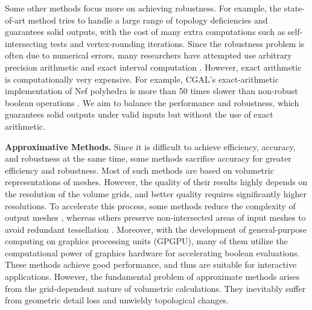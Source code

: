 Some other methods focus more on achieving robustness. For example, the state-of-art method \cite{zhou2016mesh} tries to handle a large range of topology deficiencies and guarantees solid outputs, with the cost of many extra computations such as self-intersecting tests and vertex-rounding iterations.
Since the robustness problem is often due to numerical errors, many researchers have attempted use arbitrary precision arithmetic \cite{banerjee1996topologically, fortune1995polyhedral, keyser2004esolid, granados2003boolean, hachenberger2005boolean, zhou2016mesh,barki2015exact} and exact interval computation \cite{fang1993robustness, hu1996robust, segal1990using}. However, exact arithmetic is computationally very expensive. For example, CGAL's \cite{cgal:hk-bonp3-15a} exact-arithmetic implementation \cite{granados2003boolean} of Nef polyhedra \cite{bieri1988elementary} is more than 50 times slower than non-robust boolean operations \cite{bernstein2009fast} . We aim to balance the performance and robustness, which guarantees solid outputs under valid inputs but without the use of exact arithmetic.


\textbf{Approximative Methods.}
Since it is difficult to achieve efficiency, accuracy, and robustness at the same time, some methods  sacrifice accuracy for greater efficiency and robustness. Most of such methods are based on volumetric representations of meshes. However, the quality of their results highly depends on the resolution of the volume grids, and better quality requires significantly higher resolutions.
To accelerate this process, some methods reduce the complexity of output meshes \cite{varadhan2004topology}, whereas others preserve non-intersected areas of input meshes to avoid redundant tessellation \cite{pavic2010hybrid,wang2011approximate,zhao2011parallel,hable2005blister,ogayar2006gpu,updegrove2016boolean}.
Moreover, with the development of general-purpose computing on graphics processing units (GPGPU), many of them utilize the computational power of graphics hardware for accelerating boolean evaluations. These methods achieve good performance, and thus are suitable for interactive applications. However, the fundamental problem of approximate methods arises from the grid-dependent nature of volumetric calculations. They inevitably suffer from geometric detail loss and unwieldy topological changes.

